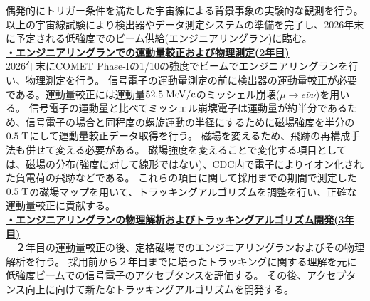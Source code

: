\documentclass[11pt,a4j,dvipdfmx]{jarticle} 					%
\newcommand{\研究課題名}{COMET Phase-Iに向けたエンジニアリングランおよびその物理解析}
\newcommand{\研究機関名}{大阪大学}
\newcommand{\研究代表者氏名}{高見 翔太   }
\begin{document}
偶発的にトリガー条件を満たした宇宙線による背景事象の実験的な観測を行う。
以上の宇宙線試験により検出器やデータ測定システムの準備を完了し、2026年末に予定される低強度でのビーム供給(エンジニアリングラン)に臨む。
\\
\noindent
\uline{\textbf{・エンジニアリングランでの運動量較正および物理測定(2年目)}}\\
2026年末にCOMET Phase-Iの1/10の強度でビームでエンジニアリングランを行い、物理測定を行う。
信号電子の運動量測定の前に検出器の運動量較正が必要である。運動量較正には運動量$52.5\;\rm{MeV/c}$のミッシェル崩壊($\mu \rightarrow e \bar{\nu}\nu$)を用いる。
信号電子の運動量と比べてミッシェル崩壊電子は運動量が約半分であるため、信号電子の場合と同程度の螺旋運動の半径にするために磁場強度を半分の$0.5\;\rm{T}$にして運動量較正データ取得を行う。
磁場を変えるため、飛跡の再構成手法も併せて変える必要がある。
磁場強度を変えることで変化する項目としては、磁場の分布(強度に対して線形ではない)、CDC内で電子によりイオン化された負電荷の飛跡などである。
これらの項目に関して採用までの期間で測定した$0.5\;\rm{T}$の磁場マップを用いて、トラッキングアルゴリズムを調整を行い、正確な運動量較正に貢献する。
\\
\noindent
\uline{\textbf{・エンジニアリングランの物理解析およびトラッキングアルゴリズム開発(3年目)}}\\
　２年目の運動量較正の後、定格磁場でのエンジニアリングランおよびその物理解析を行う。
採用前から２年目までに培ったトラッキングに関する理解を元に低強度ビームでの信号電子のアクセプタンスを評価する。
その後、アクセプタンス向上に向けて新たなトラッキングアルゴリズムを開発する。
\end{document}
